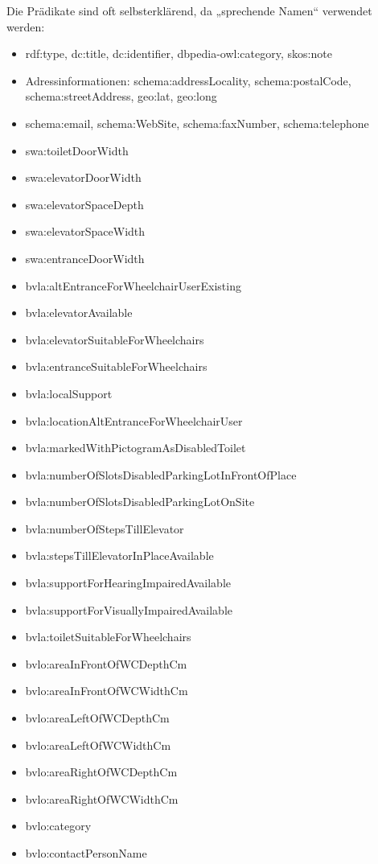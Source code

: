 \documentclass[a4paper,11pt]{article}
\begin{document}
Die Prädikate sind oft selbsterklärend, da „sprechende Namen“ verwendet werden:
\begin{itemize}\itemsep0pt
\item rdf:type, dc:title, dc:identifier, dbpedia-owl:category, skos:note
\item Adressinformationen: schema:addressLocality, schema:postalCode,\\ schema:streetAddress, geo:lat, geo:long
\item schema:email, schema:WebSite, schema:faxNumber, schema:telephone
\item swa:toiletDoorWidth
\item swa:elevatorDoorWidth
\item swa:elevatorSpaceDepth
\item swa:elevatorSpaceWidth
\item swa:entranceDoorWidth
\item bvla:altEntranceForWheelchairUserExisting
\item bvla:elevatorAvailable
\item bvla:elevatorSuitableForWheelchairs
\item bvla:entranceSuitableForWheelchairs
\item bvla:localSupport
\item bvla:locationAltEntranceForWheelchairUser
\item bvla:markedWithPictogramAsDisabledToilet
\item bvla:numberOfSlotsDisabledParkingLotInFrontOfPlace
\item bvla:numberOfSlotsDisabledParkingLotOnSite
\item bvla:numberOfStepsTillElevator
\item bvla:stepsTillElevatorInPlaceAvailable
\item bvla:supportForHearingImpairedAvailable
\item bvla:supportForVisuallyImpairedAvailable
\item bvla:toiletSuitableForWheelchairs
\item bvlo:areaInFrontOfWCDepthCm
\item bvlo:areaInFrontOfWCWidthCm
\item bvlo:areaLeftOfWCDepthCm
\item bvlo:areaLeftOfWCWidthCm
\item bvlo:areaRightOfWCDepthCm
\item bvlo:areaRightOfWCWidthCm
\item bvlo:category
\item bvlo:contactPersonName

\end{itemize}
\end{document}
